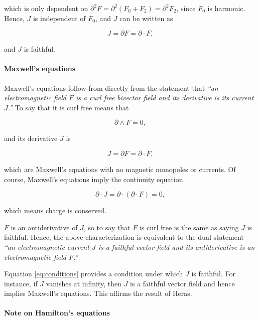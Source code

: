 \documentclass[twocolumn]{article}
\begin{document}
which is only dependent on $\partial^2 F = \partial^2 (F_0 + F_2) = \partial^2 F_2$, since $F_0$ is harmonic. Hence, $J$ is independent of $F_0$, and $J$ can be written as 

\begin{equation}
  J = \partial F = \partial \cdot F,
\end{equation}

and $J$ is faithful.

\paragraph{Maxwell's equations}

Maxwell's equations follow from directly from the statement that \emph{``an electromagnetic field $F$ is a curl free bivector field and its derivative is its current $J$.''} To say that it is curl free means that

\begin{equation}
  \partial \wedge F = 0,
\end{equation}

and its derivative $J$ is

\begin{equation}
  J = \partial F = \partial \cdot F,
\end{equation} 

which are Maxwell's equations with no magnetic monopoles or currents. Of course, Maxwell's equations imply the continuity equation

\begin{equation}
  \partial \cdot J = \partial \cdot (\partial \cdot F) = 0, \label{eq:continuity}
\end{equation} 

which means charge is conserved. 

$F$ is an antiderivative of $J$, so to say that $F$ is curl free is the same as saying $J$ is faithful. Hence, the above characterization is equivalent to the dual statement \emph{``an electromagnetic current $J$ is a faithful vector field and its antiderivative is an electromagnetic field $F$.''}

Equation \ref{eq:conditions} provides a condition under which $J$ is faithful. For instance, if $J$ vanishes at infinity, then $J$ is a faithful vector field and hence implies Maxwell's equations. This affirms the result of Heras.\cite{heras}

\paragraph{Note on Hamilton's equations}
\end{document}
